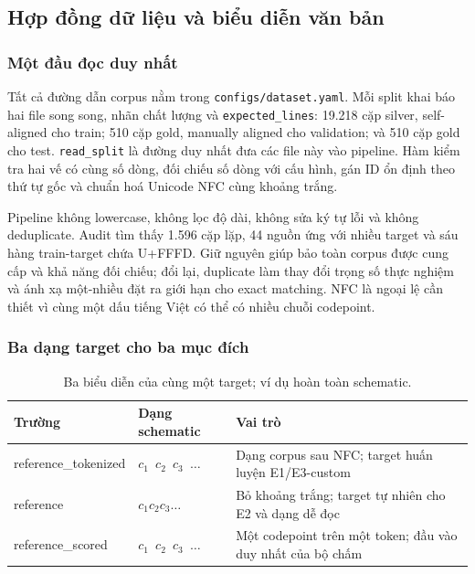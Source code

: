 \subsection{Hợp đồng dữ liệu và biểu diễn văn bản}

\subsubsection{Một đầu đọc duy nhất}

Tất cả đường dẫn corpus nằm trong \texttt{configs/dataset.yaml}. Mỗi split
khai báo hai file song song, nhãn chất lượng và \texttt{expected\_lines}:
19.218 cặp silver, self-aligned cho train; 510 cặp gold, manually aligned cho
validation; và 510 cặp gold cho test. \texttt{read\_split} là đường duy nhất
đưa các file này vào pipeline. Hàm kiểm tra hai vế có cùng số dòng, đối chiếu
số dòng với cấu hình, gán ID ổn định theo thứ tự gốc và chuẩn hoá Unicode NFC
cùng khoảng trắng.

Pipeline không lowercase, không lọc độ dài, không sửa ký tự lỗi và không
deduplicate. Audit tìm thấy 1.596 cặp lặp, 44 nguồn ứng với nhiều target và
sáu hàng train-target chứa U+FFFD. Giữ nguyên giúp bảo toàn corpus được cung
cấp và khả năng đối chiếu; đổi lại, duplicate làm thay đổi trọng số thực
nghiệm và ánh xạ một-nhiều đặt ra giới hạn cho exact matching. NFC là ngoại lệ
cần thiết vì cùng một dấu tiếng Việt có thể có nhiều chuỗi codepoint.

\subsubsection{Ba dạng target cho ba mục đích}

\begin{table}[tbp]
  \centering
  \small
  \renewcommand{\arraystretch}{1.18}
  \caption{Ba biểu diễn của cùng một target; ví dụ hoàn toàn schematic.}
  \label{tab:target-forms}
  \begin{tabularx}{\textwidth}{@{}>{\ttfamily}p{3.3cm}p{4.2cm}X@{}}
    \toprule
    \normalfont\textbf{Trường} & \textbf{Dạng schematic} & \textbf{Vai trò} \\
    \midrule
    reference\_\allowbreak tokenized & \texttt{$c_1$ $c_2$ $c_3$ $\ldots$}
      & Dạng corpus sau NFC; target huấn luyện E1/E3-custom \\
    reference & \texttt{$c_1c_2c_3\ldots$}
      & Bỏ khoảng trắng; target tự nhiên cho E2 và dạng dễ đọc \\
    reference\_scored & \texttt{$c_1$ $c_2$ $c_3$ $\ldots$}
      & Một codepoint trên một token; đầu vào duy nhất của bộ chấm \\
    \bottomrule
  \end{tabularx}
\end{table}

